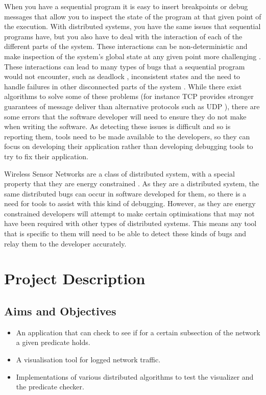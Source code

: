 \documentclass[a4paper]{article}
\begin{document}
When you have a sequential program it is easy to insert breakpoints or debug messages that allow you to inspect the state of the program at that given point of the execution. With distributed systems, you have the same issues that sequential programs have, but you also have to deal with the interaction of each of the different parts of the system. These interactions can be non-deterministic \cite{liu2007wids} and make inspection of the system's global state at any given point more challenging \cite{chandy1985distributed}. These interactions can lead to many types of bugs that a sequential program would not encounter, such as deadlock \cite{singhal1989deadlock}, inconsistent states \cite{?} and the need to handle failures in other disconnected parts of the system \cite{?}. While there exist algorithms to solve some of these problems (for instance TCP provides stronger guarantees of message deliver than alternative protocols such as UDP \cite[p.~532]{Tanenbaum:2002:CN:572404}), there are some errors that the software developer will need to ensure they do not make when writing the software. As detecting these issues is difficult and so is reporting them, tools need to be made available to the developers, so they can focus on developing their application rather than developing debugging tools to try to fix their application.

Wireless Sensor Networks are a class of distributed system, with a special property that they are energy constrained \cite{6023235}.  As they are a distributed system, the same distributed bugs can occur in software developed for them, so there is a need for tools to assist with this kind of debugging. However, as they are energy constrained developers will attempt to make certain optimisations that may not have been required with other types of distributed systems. This means any tool that is specific to them will need to be able to detect these kinds of bugs and relay them to the developer accurately.


\section{Project Description}

\subsection{Aims and Objectives}
\begin{itemize}
	\item An application that can check to see if for a certain subsection of the network a given predicate holds.
	\item A visualisation tool for logged network traffic.
	\item Implementations of various distributed algorithms to test the visualizer and the predicate checker.
\end{itemize}
\end{document}
